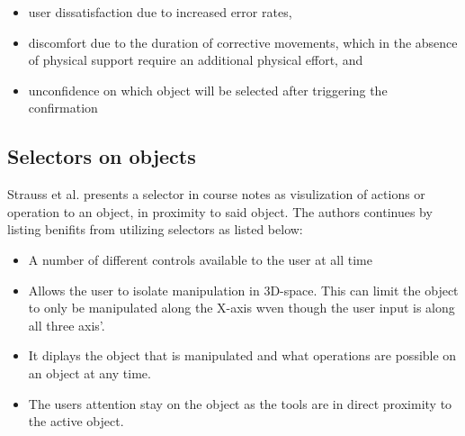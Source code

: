 \begin{itemize}
\item user dissatisfaction due to increased error rates,
\item discomfort due to the duration of corrective movements, which in the absence of physical support require an additional physical effort, and
\item unconfidence on which object will be selected after triggering the confirmation
\end{itemize}

\subsection{Selectors on objects}
\label{theory:toolsandtech:selector}
Strauss et al. presents a selector in course notes as visulization of actions or operation to an object, in proximity to said object.\cite{tools:strauss2002design} The authors continues by listing benifits from utilizing selectors as listed below:
\begin{itemize}
  \item A number of different controls available to the user at all time
  \item Allows the user to isolate manipulation in 3D-space. This can limit the object to only be manipulated along the X-axis wven though the user input is along all three axis'.
  \item It diplays the object that is manipulated and what operations are possible on an object at any time.
  \item The users attention stay on the object as the tools are in direct proximity to the active object.

\end{itemize}
